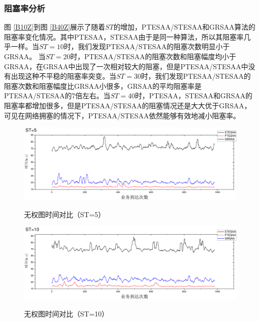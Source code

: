 \subsubsection{阻塞率分析}
图 \ref{B10Z}到图 \ref{B40Z}展示了随着$ST$的增加，PTESAA/STESAA和GRSAA算法的阻塞率变化情况。其中PTESAA，STESAA由于是同一种算法，所以其阻塞率几乎一样。当$ST=10$时，我们发现PTESAA/STESAA的阻塞次数明显小于GRSAA。 当$ST=20$时，PTESAA/STESAA的阻塞次数和阻塞幅度均小于GRSAA，在GRSAA中出现了一次相对较大的阻塞，但是PTESAA/STESAA中没有出现这种不平稳的阻塞率突变。当$ST=30$时，我们发现PTESAA/STESAA的阻塞次数和阻塞幅度比GRSAA小很多，GRSAA的平均阻塞率是PTESAA/STESAA的7倍左右。当$ST=40$时，PTESAA，STESAA和GRSAA的阻塞率都增加很多，但是PTESAA/STESAA的阻塞情况还是大大优于GRSAA，可见在网络拥塞的情况下，PTESAA/STESAA依然能够有效地减小阻塞率。
\begin{figure}
\vspace{-0.5cm}
\setlength{\abovecaptionskip}{-0.5cm}
\begin{center}
{\includegraphics[width=1 \textwidth]{figures/B5T.pdf}}
\end{center}
\caption{{\footnotesize{无权图时间对比（ST=5）}}}
\label{B5T}
\end{figure}
\begin{figure}
\vspace{-0.5cm}
\setlength{\abovecaptionskip}{-0.5cm}
\begin{center}
{\includegraphics[width=1 \textwidth]{figures/B10T.pdf}}
\end{center}
\caption{{\footnotesize{无权图时间对比（ST=10）}}}
\label{B10T}
\end{figure}
